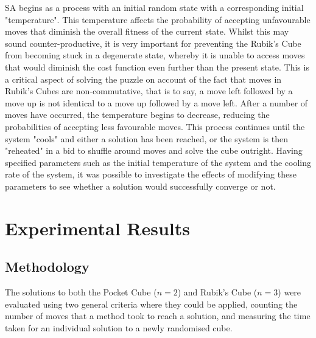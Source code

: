 \documentclass[UKenglish]{libraries/svproc}
\begin{document}
SA begins as a process with an initial random state with a corresponding initial "temperature". This temperature affects the probability of accepting unfavourable moves that diminish the overall fitness of the current state. Whilst this may sound counter-productive, it is very important for preventing the Rubik's Cube from becoming stuck in a degenerate state, whereby it is unable to access moves that would diminish the cost function even further than the present state. This is a critical aspect of solving the puzzle on account of the fact that moves in Rubik's Cubes are non-commutative, that is to say, a move left followed by a move up is not identical to a move up followed by a move left. After a number of moves have occurred, the temperature begins to decrease, reducing the probabilities of accepting less favourable moves. This process continues until the system "cools" and either a solution has been reached, or the system is then "reheated" in a bid to shuffle around moves and solve the cube outright. Having specified parameters such as the initial temperature of the system and the cooling rate of the system, it was possible to investigate the effects of modifying these parameters to see whether a solution would successfully converge or not.



\section{Experimental Results}

\subsection{Methodology}
The solutions to both the Pocket Cube ($n=2$) and Rubik's Cube ($n=3$) were evaluated using two general criteria where they could be applied, counting the number of moves that a method took to reach a solution, and measuring the time taken for an individual solution to a newly randomised cube.
\end{document}
